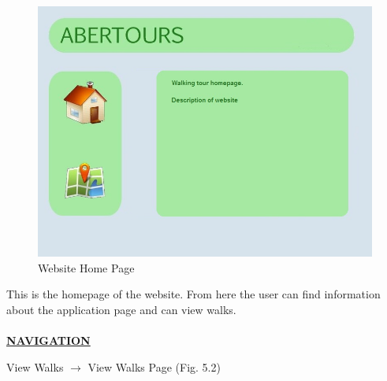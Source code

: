 \documentclass[12pt]{article}
\begin{document}
\begin{figure}[htp]
\centering

\includegraphics[scale=0.60]{Project_Plan/Web/homepage_01.jpg}
\caption{Website Home Page}
\label{Website Home Page}
\end{figure}
\par{This is the homepage of the website. From here the user can find information about the application page and can view walks. \\ \\}
\textbf{\uline{NAVIGATION}}
\par{View Walks $\rightarrow$ View Walks Page (Fig. 5.2)}
\clearpage
\end{document}
